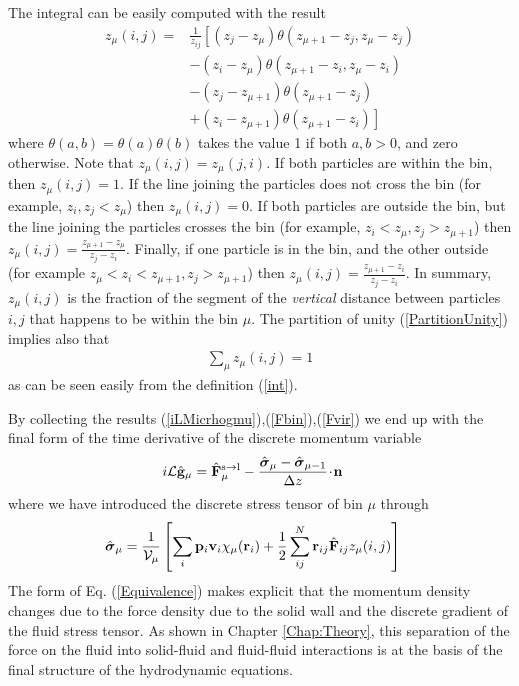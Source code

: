\documentclass[b5paper,openright,11pt]{book}
\newcommand{\esc}{\!\cdot\!}
\begin{document}
The integral can be easily computed with the result
\begin{align}
 z_\mu(i,j)=&\frac{1}{z_{ij}}\left[(z_j-z_\mu) \theta(z_{\mu+1}-z_{j},z_\mu-z_{j} )\right.
\nonumber\\
&-(z_i-z_\mu) \theta(z_{\mu+1}-z_i,z_\mu-z_i)
\nonumber\\
&-(z_{j}-z_{\mu+1}) \theta(z_{\mu+1}-z_{j})
\nonumber\\
&\left.+(z_i-z_{\mu+1}) \theta (z_{\mu+1}-z_i)\right]
\end{align}
where  $\theta(a,b)=\theta(a)\theta(b)$  takes  the value  1  if  both
$a,b>0$, and  zero otherwise.  Note that  $z_\mu(i,j)=z_\mu(j,i)$.  If
both particles are within the bin,  then $ z_\mu(i,j)=1$.  If the line
joining  the   particles  does  not   cross  the  bin   (for  example,
$z_i,z_j<z_\mu$) then  $z_\mu(i,j)=0$.  If both particles  are outside
the  bin, but  the line  joining the  particles crosses  the bin  (for
example,                $z_i<z_\mu,z_j>z_{\mu+1}$)                then
$z_\mu(i,j)=\frac{z_{\mu+1}-z_\mu}{z_j-z_i}$. Finally, if one particle
is   in    the   bin,   and    the   other   outside    (for   example
$z_\mu<z_i<z_{\mu+1},               z_j>z_{\mu+1}$)               then
$z_\mu(i,j)=\frac{z_{\mu+1}-z_i}{z_j-z_i}$.  In  summary, $z_\mu(i,j)$
is  the fraction  of  the segment  of  the \textit{vertical}  distance
between particles $i,j$ that happens to  be within the bin $\mu$. 
The  partition  of unity  (\ref{PartitionUnity})
implies also that
\begin{align}
  \sum_\mu z_{\mu}(i,j) =1
\label{zmu1}
\end{align}
as can be seen easily from the definition (\ref{int}).

By                collecting                the                results
(\ref{iLMicrhogmu}),(\ref{Fbin}),(\ref{Fvir}) we end  up
with the final form of the time derivative of the discrete momentum variable
\begin{align}
  i{\cal L}\hat{\bf g}_\mu &=\hat{\bf F}_\mu^{\rm s\to l}-\frac{\hat{\boldsymbol{\sigma}}_\mu-\hat{\boldsymbol{\sigma}}_{\mu-1}}{\Delta z}\esc{\bf n}
\label{Equivalence}
\end{align}
where we have introduced the discrete stress tensor of bin $\mu$ through
\begin{align}
 \hat{ \boldsymbol{\sigma}}_{\mu}
&=
\frac{1}{{\cal V}_\mu} \left[\sum_i{\bf p}_i{\bf v}_i\chi_\mu({\bf r}_i)
+\frac{1}{2}\sum^{N}_{ij}{\bf r}_{ij}\hat{\bf F}_{ij}z_\mu(i,j)\right]
\label{sbin}
\end{align}
The form of  Eq. (\ref{Equivalence}) makes explicit  that the momentum
density changes due to the force density due to the solid wall and the
discrete gradient of  the fluid stress tensor. As shown in Chapter \ref{Chap:Theory}, this  separation of the
force on the fluid into  solid-fluid and fluid-fluid interactions is at
the basis of the final structure of the hydrodynamic equations.
\end{document}
